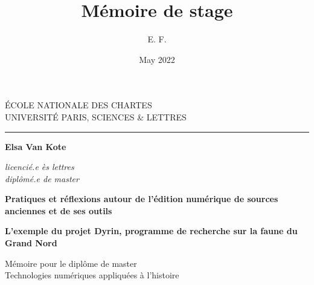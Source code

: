 \documentclass[a4paper,12pt,twoside]{book}
\title{Mémoire de stage}
\author{E. F.}
\date{May 2022}
\begin{document}
\begin{titlepage}
		\begin{center}
			
			\bigskip
			
			\begin{large}				
				ÉCOLE NATIONALE DES CHARTES\\
				UNIVERSITÉ PARIS, SCIENCES \& LETTRES
			\end{large}
			\begin{center}\rule{2cm}{0.02cm}\end{center}
			
			\bigskip
			\bigskip
			\bigskip
			\begin{Large}
				\textbf{Elsa Van Kote}\\
			\end{Large}
			\begin{normalsize} \textit{licencié.e ès lettres}\\
				\textit{diplômé.e de master}
			\end{normalsize}
			
			\bigskip
			\bigskip
			\bigskip
			
			\begin{Huge}
				\textbf{Pratiques et réflexions autour de l'édition numérique de sources anciennes et de ses outils}\\
			\end{Huge}
			\bigskip
			\bigskip
			\begin{LARGE}
				\textbf{L'exemple du projet Dyrin, programme de recherche sur la faune du Grand Nord}\\
			\end{LARGE}
			
			\bigskip
			\bigskip
			\bigskip
			\begin{large}
			\end{large}
			\vfill
			
			\begin{large}
				Mémoire 
				pour le diplôme de master \\
				\og{} Technologies numériques appliquées à l'histoire \fg{} \\
			\end{large}
			
		\end{center}
	\end{titlepage}

	\thispagestyle{empty}	
	\cleardoublepage
	
	\frontmatter
\end{document}

